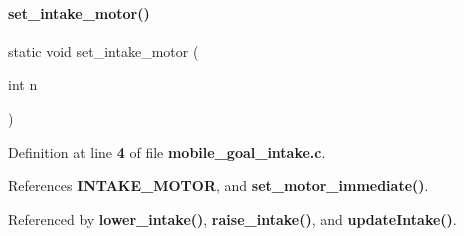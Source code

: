 \paragraph{set\+\_\+intake\+\_\+motor()}
{\footnotesize\ttfamily static void set\+\_\+intake\+\_\+motor (\begin{DoxyParamCaption}\item[{int}]{n }\end{DoxyParamCaption})\hspace{0.3cm}{\ttfamily [static]}}



Definition at line \textbf{ 4} of file \textbf{ mobile\+\_\+goal\+\_\+intake.\+c}.



References \textbf{ I\+N\+T\+A\+K\+E\+\_\+\+M\+O\+T\+OR}, and \textbf{ set\+\_\+motor\+\_\+immediate()}.



Referenced by \textbf{ lower\+\_\+intake()}, \textbf{ raise\+\_\+intake()}, and \textbf{ update\+Intake()}.


